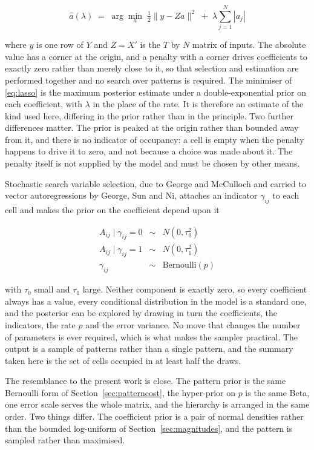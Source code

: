 \begin{equation}
\hat{a}(\lambda) \;=\; \arg\min_{a} \; \tfrac{1}{2} \| y - Z a \|^{2}
\;+\; \lambda \sum_{j=1}^{N} |a_{j}|
\label{eq:lasso}
\end{equation}

where $y$ is one row of $Y$ and $Z = X'$ is the $T$ by $N$ matrix of inputs. The
absolute value has a corner at the origin, and a penalty with a corner drives
coefficients to exactly zero rather than merely close to it, so that selection and
estimation are performed together and no search over patterns is required. The
minimiser of \eqref{eq:lasso} is the maximum posterior estimate under a
double-exponential prior on each coefficient, with $\lambda$ in the place of the
rate. It is therefore an estimate of the kind used here, differing in the prior
rather than in the principle. Two further differences matter. The prior is peaked at
the origin rather than bounded away from it, and there is no indicator of occupancy:
a cell is empty when the penalty happens to drive it to zero, and not because a
choice was made about it. The penalty itself is not supplied by the model and must be
chosen by other means.

Stochastic search variable selection, due to George and McCulloch and carried to
vector autoregressions by George, Sun and Ni, attaches an indicator $\gamma_{ij}$ to
each cell and makes the prior on the coefficient depend upon it

\begin{eqnarray}
A_{ij} \mid \gamma_{ij} = 0 &\sim& N(0, \tau_{0}^{2})
\label{eq:ssvs_A}
\\
A_{ij} \mid \gamma_{ij} = 1 &\sim& N(0, \tau_{1}^{2})
\label{eq:ssvs_B}
\\
\gamma_{ij} &\sim& \mathrm{Bernoulli}(p)
\label{eq:ssvs_C}
\end{eqnarray}

with $\tau_{0}$ small and $\tau_{1}$ large. Neither component is exactly zero, so
every coefficient always has a value, every conditional distribution in the model is
a standard one, and the posterior can be explored by drawing in turn the
coefficients, the indicators, the rate $p$ and the error variance. No move that
changes the number of parameters is ever required, which is what makes the sampler
practical. The output is a sample of patterns rather than a single pattern, and the
summary taken here is the set of cells occupied in at least half the draws.

The resemblance to the present work is close. The pattern prior is the same Bernoulli
form of Section~\ref{sec:patterncost}, the hyper-prior on $p$ is the same Beta, one
error scale serves the whole matrix, and the hierarchy is arranged in the same order.
Two things differ. The coefficient prior is a pair of normal densities rather than
the bounded log-uniform of Section~\ref{sec:magnitudes}, and the pattern is sampled
rather than maximised.

